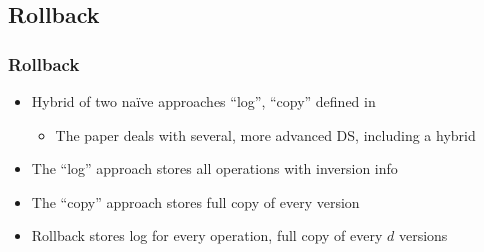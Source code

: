 \documentclass{beamer}
\begin{document}
\begin{frame}
\begin{figure}
\end{figure}
\end{frame}

\subsection{Rollback}
\begin{frame}
\frametitle{Rollback}
\begin{itemize}
  \item Hybrid of two na\"ive approaches ``log'', ``copy'' defined in \cite{Tsotras1995237}
  \begin{itemize}
    \item The paper deals with several, more advanced DS, including a hybrid
  \end{itemize}
  \pause
  \item The ``log'' approach stores all operations with inversion info
  \pause
  \item The ``copy'' approach stores full copy of every version
  \pause
  \item Rollback stores log for every operation, full copy of every $d$ versions
\end{itemize}
\end{frame}
\end{document}
